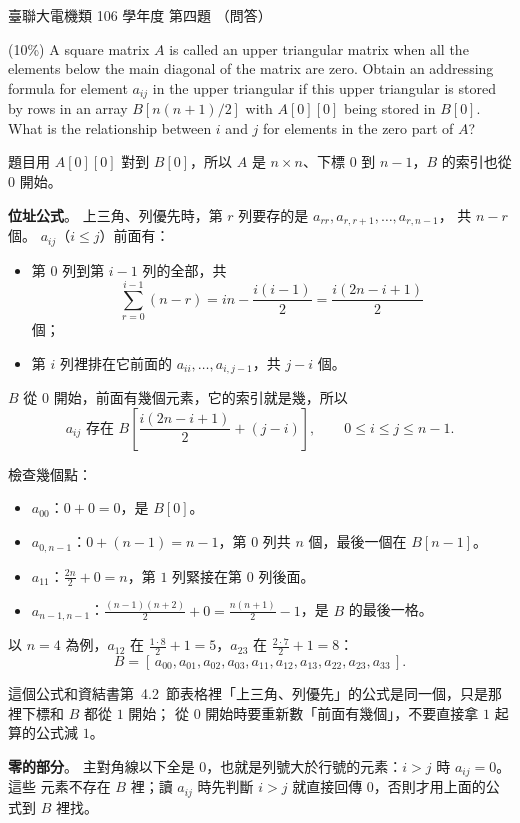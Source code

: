 \begin{pastexam}[label={px:ust-106-ee-ds-04}]{臺聯大電機類 106 學年度 第四題}
（問答）

(10\%) A square matrix $A$ is called an upper triangular matrix when all the elements below the main
diagonal of the matrix are zero. Obtain an addressing formula for element $a_{ij}$ in the upper
triangular if this upper triangular is stored by rows in an array $B[n(n{+}1)/2]$ with $A[0][0]$ being
stored in $B[0]$. What is the relationship between $i$ and $j$ for elements in the zero part of $A$?
\end{pastexam}

\begin{pastsoln}
題目用 $A[0][0]$ 對到 $B[0]$，所以 $A$ 是 $n \times n$、下標 $0$ 到 $n - 1$，$B$ 的索引也從 $0$
開始。

\textbf{位址公式}。 上三角、列優先時，第 $r$ 列要存的是 $a_{rr}, a_{r,r+1}, \ldots, a_{r,n-1}$，
共 $n - r$ 個。 $a_{ij}$（$i \le j$）前面有：
\begin{itemize}
\item 第 $0$ 列到第 $i - 1$ 列的全部，共
\[
\sum_{r=0}^{i-1} (n - r) = in - \frac{i(i - 1)}{2} = \frac{i(2n - i + 1)}{2}
\]
個；
\item 第 $i$ 列裡排在它前面的 $a_{ii}, \ldots, a_{i,j-1}$，共 $j - i$ 個。
\end{itemize}
$B$ 從 $0$ 開始，前面有幾個元素，它的索引就是幾，所以
\[
a_{ij} \text{ 存在 } B\!\left[\frac{i(2n - i + 1)}{2} + (j - i)\right], \qquad 0 \le i \le j \le n - 1.
\]

檢查幾個點：
\begin{itemize}
\item $a_{00}$：$0 + 0 = 0$，是 $B[0]$。
\item $a_{0,n-1}$：$0 + (n - 1) = n - 1$，第 $0$ 列共 $n$ 個，最後一個在 $B[n - 1]$。
\item $a_{11}$：$\frac{2n}{2} + 0 = n$，第 $1$ 列緊接在第 $0$ 列後面。
\item $a_{n-1,n-1}$：$\frac{(n - 1)(n + 2)}{2} + 0 = \frac{n(n + 1)}{2} - 1$，是 $B$ 的最後一格。
\end{itemize}
以 $n = 4$ 為例，$a_{12}$ 在 $\frac{1 \cdot 8}{2} + 1 = 5$，$a_{23}$ 在
$\frac{2 \cdot 7}{2} + 1 = 8$：
\[
B = [\,a_{00}, a_{01}, a_{02}, a_{03}, a_{11}, a_{12}, a_{13}, a_{22}, a_{23}, a_{33}\,].
\]

這個公式和資結書第~4.2~節表格裡「上三角、列優先」的公式是同一個，只是那裡下標和 $B$ 都從 $1$ 開始；
從 $0$ 開始時要重新數「前面有幾個」，不要直接拿 $1$ 起算的公式減 $1$。

\textbf{零的部分}。 主對角線以下全是 $0$，也就是列號大於行號的元素：$i > j$ 時 $a_{ij} = 0$。 這些
元素不存在 $B$ 裡；讀 $a_{ij}$ 時先判斷 $i > j$ 就直接回傳 $0$，否則才用上面的公式到 $B$ 裡找。
\end{pastsoln}
